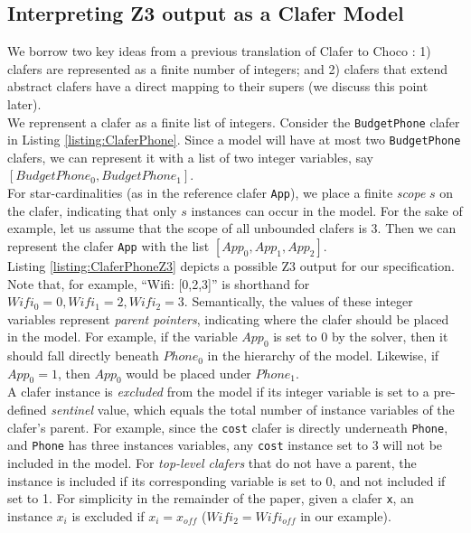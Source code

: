 \documentclass{easychair}
\begin{document}
\subsection{Interpreting Z3 output as a Clafer Model}
We borrow two key ideas from a previous translation of Clafer to Choco \cite{Liang}: 1) clafers are represented as a finite number of integers; and 2) clafers that extend abstract clafers have a direct mapping to their supers (we discuss this point later).\\
\indent We reprensent a clafer as a finite list of integers. Consider the \texttt{BudgetPhone} clafer in Listing \ref{listing:ClaferPhone}. Since a model will have at most two \texttt{BudgetPhone} clafers, we can represent it with a list of two integer variables, say $[BudgetPhone_0, BudgetPhone_1]$.  \\
\indent For star-cardinalities (as in the reference clafer \texttt{App}), we place a finite \textit{scope} $s$ on the clafer, indicating that only $s$ instances can occur in the model. For the sake of example, let us assume that the scope of all unbounded clafers is $3$. Then we can represent the clafer \texttt{App} with the list $[App_0, App_1, App_2]$.\\
\indent Listing \ref{listing:ClaferPhoneZ3} depicts a possible Z3 output for our specification. Note that, for example, ``Wifi: [0,2,3]'' is shorthand for $Wifi_0 = 0, Wifi_1 = 2, Wifi_2 = 3$. Semantically, the values of these integer variables represent \textit{parent pointers}, indicating where the clafer should be placed in the model. For example, if the variable $App_0$ is set to $0$ by the solver, then it should fall directly beneath $Phone_0$ in the hierarchy of the model. Likewise, if $App_0 = 1$, then $App_0$ would be placed under $Phone_1$.\\
\indent A clafer instance is \textit{excluded} from the model if its integer variable is set to a pre-defined \textit{sentinel} value, which equals the total number of instance variables of the clafer's parent. For example, since the \texttt{cost} clafer is directly underneath \texttt{Phone}, and \texttt{Phone} has three instances variables, any \texttt{cost} instance set to 3 will not be included in the model. For \textit{top-level clafers} that do not have a parent, the instance is included if its corresponding variable is set to 0, and not included if set to 1. For simplicity in the remainder of the paper, given a clafer \texttt{x}, an instance \textit{$x_i$} is excluded if  $x_i = x_{off}$ ($Wifi_2 = Wifi_{off}$ in our example). \\
\end{document}
